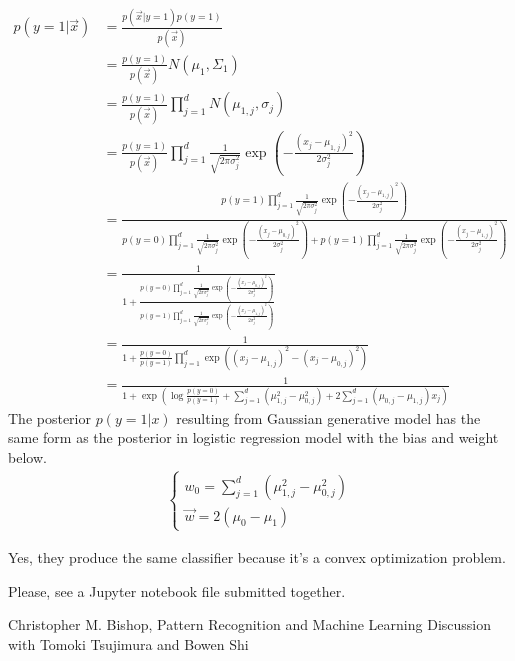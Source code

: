 \documentclass{introtosml}
\newcommand{\x}{\vec{x}}
\newcommand{\w}{\vec{w}}
\newcommand\expp[1]{\exp\left(#1\right)}
\newcommand\gauss[1]{\prod_{j=1}^d \frac{1}{\sqrt{2 \pi \sigma_j^2}} \expp{- \frac{(x_j - \mu_{#1,j})^2}{2 \sigma_j^2}}}
\newcommand\cgauss[1]{p(y=#1)\gauss{#1}}
\newcommand\pbias{\frac{p(y=0)}{p(y=1)}}
\begin{document}
\maketitle

\begin{p}
  \item
    \begin{align*}
      p(y=1|\x)
      & = \frac{p(\x|y=1)p(y=1)}{p(\x)} \\
      & = \frac{p(y=1)}{p(\x)} N(\mu_1, \Sigma_1) \\
      & = \frac{p(y=1)}{p(\x)} \prod_{j=1}^d N(\mu_{1,j}, \sigma_j) \\
      & = \frac{p(y=1)}{p(\x)} \gauss{1} \\
      & = \frac{\cgauss{1}}{\cgauss{0} + \cgauss{1}} \\
      & = \frac{1}{1 + \frac{\cgauss{0}}{\cgauss{1}}} \\
      & = \frac{1}{1 + \pbias \prod_{j=1}^d \expp{(x_j - \mu_{1,j})^2 - (x_j - \mu_{0,j})^2}} \\
      & = \frac{1}{1 +
          \expp{\log \pbias + \sum_{j=1}^d (\mu_{1,j}^2 - \mu_{0,j}^2)
          + 2 \sum_{j=1}^d (\mu_{0,j} - \mu_{1,j}) x_j}}
    \end{align*}
    \therefore The posterior $p(y=1|x)$ resulting from Gaussian generative
    model has the same form as the posterior in logistic regression model
    with the bias and weight below.
    \begin{gather*}
      \begin{cases}
        w_0 = \sum_{j=1}^d (\mu_{1,j}^2 - \mu_{0,j}^2) \\
        \w = 2 (\mu_0 - \mu_1)
      \end{cases}
    \end{gather*}

  \item
    Yes, they produce the same classifier because it's a convex optimization problem.

  \item
    Please, see a Jupyter notebook file submitted together.
\end{p}

\begin{thebibliography}{9}
   Christopher M. Bishop, Pattern Recognition and Machine Learning
   Discussion with Tomoki Tsujimura and Bowen Shi
\end{thebibliography}
\end{document}
